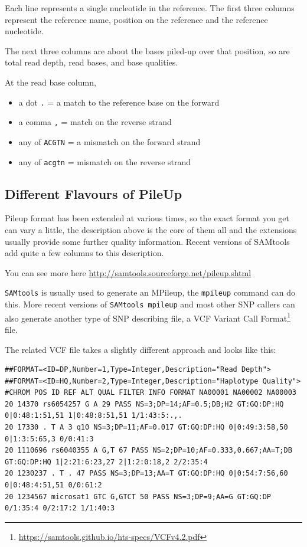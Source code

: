 \documentclass[12pt,]{book}
\providecommand{\tightlist}{%
  \setlength{\itemsep}{0pt}\setlength{\parskip}{0pt}}
\let\rmarkdownfootnote\footnote%
\def\footnote{\protect\rmarkdownfootnote}
\renewcommand{\href}[2]{#2\footnote{\url{#1}}}
\theoremstyle{definition}
\theoremstyle{definition}
\theoremstyle{remark}
\begin{document}
Each line represents a single nucleotide in the reference. The first
three columns represent the reference name, position on the reference
and the reference nucleotide.

The next three columns are about the bases piled-up over that position,
so are total read depth, read bases, and base qualities.

At the read base column,

\begin{itemize}
\tightlist
\item
  a dot \texttt{.} = a match to the reference base on the forward
\item
  a comma \texttt{,} = match on the reverse strand
\item
  any of \texttt{ACGTN} = a mismatch on the forward strand
\item
  any of \texttt{acgtn} = mismatch on the reverse strand
\end{itemize}

\subsection{Different Flavours of
PileUp}\label{different-flavours-of-pileup}

Pileup format has been extended at various times, so the exact format
you get can vary a little, the description above is the core of them all
and the extensions usually provide some further quality information.
Recent versions of SAMtools add quite a few columns to this description.

You can see more here \url{http://samtools.sourceforge.net/pileup.shtml}

\texttt{SAMtools} is usually used to generate an MPileup, the
\texttt{mpileup} command can do this. More recent versions of
\texttt{SAMtools\ mpileup} and most other SNP callers can also generate
another type of SNP describing file, a VCF
\href{https://samtools.github.io/hts-specs/VCFv4.2.pdf}{Variant Call
Format} file.

The related VCF file takes a slightly different approach and looks like
this:

\begin{verbatim}
##FORMAT=<ID=DP,Number=1,Type=Integer,Description="Read Depth">
##FORMAT=<ID=HQ,Number=2,Type=Integer,Description="Haplotype Quality">
#CHROM POS ID REF ALT QUAL FILTER INFO FORMAT NA00001 NA00002 NA00003
20 14370 rs6054257 G A 29 PASS NS=3;DP=14;AF=0.5;DB;H2 GT:GQ:DP:HQ 0|0:48:1:51,51 1|0:48:8:51,51 1/1:43:5:.,.
20 17330 . T A 3 q10 NS=3;DP=11;AF=0.017 GT:GQ:DP:HQ 0|0:49:3:58,50 0|1:3:5:65,3 0/0:41:3
20 1110696 rs6040355 A G,T 67 PASS NS=2;DP=10;AF=0.333,0.667;AA=T;DB GT:GQ:DP:HQ 1|2:21:6:23,27 2|1:2:0:18,2 2/2:35:4
20 1230237 . T . 47 PASS NS=3;DP=13;AA=T GT:GQ:DP:HQ 0|0:54:7:56,60 0|0:48:4:51,51 0/0:61:2
20 1234567 microsat1 GTC G,GTCT 50 PASS NS=3;DP=9;AA=G GT:GQ:DP 0/1:35:4 0/2:17:2 1/1:40:3
\end{verbatim}
\end{document}
